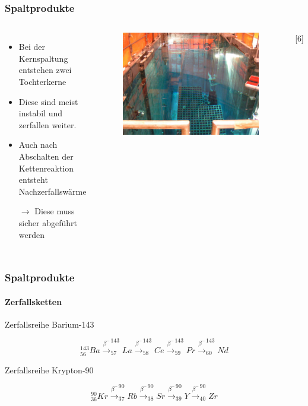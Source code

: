 \documentclass{beamer}[9pt]
\begin{document}
\begin{frame}
\frametitle{Spaltprodukte}
\begin{columns}

\begin{itemize}

\item Bei der Kernspaltung entstehen zwei Tochterkerne
\item Diese sind meist instabil und zerfallen weiter.
\item Auch nach Abschalten der Kettenreaktion entsteht Nachzerfallswärme
\item[$\rightarrow$] Diese muss sicher abgeführt werden
\end{itemize}
\begin{figure}

\includegraphics[scale=.16]{abklingbecken.jpg}
\end{figure}
\hspace{.5\columnwidth}[6]
\end{columns}
\end{frame}

\begin{frame}
\frametitle{Spaltprodukte}
\framesubtitle{Zerfallsketten}
\begin{block}{Zerfallsreihe Barium-143}

\[
^{143}_{56}Ba \overset{\beta^-}{\rightarrow}^{143}_{57}La \overset{\beta^-}{\rightarrow} ^{143}_{58}Ce \overset{\beta^-}{\rightarrow} ^{143}_{59}Pr \overset{\beta^-}{\rightarrow}^{143}_{60} Nd\]

\end{block}

\begin{block}{Zerfallsreihe Krypton-90}

\[
^{90}_{36}Kr \overset{\beta^-}{\rightarrow}^{90}_{37}Rb \overset{\beta^-}{\rightarrow} ^{90}_{38}Sr \overset{\beta^-}{\rightarrow} ^{90}_{39}Y \overset{\beta^-}{\rightarrow}^{90}_{40} Zr\]

\end{block}
\end{frame}
\end{document}
